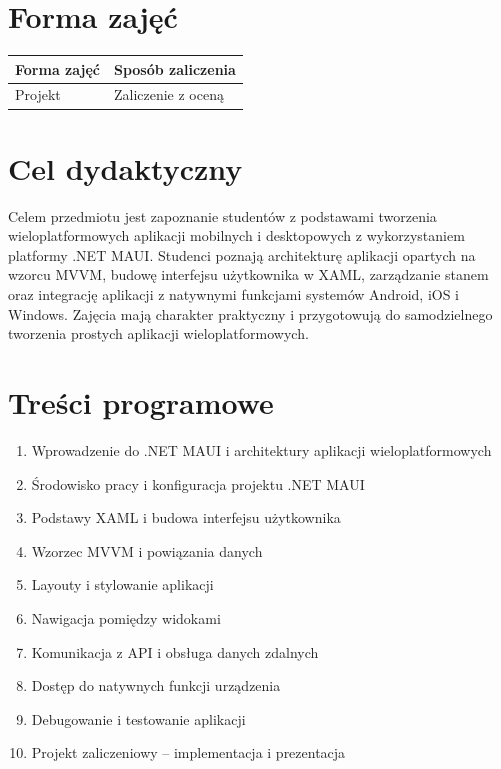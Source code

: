 \documentclass[12pt, a4paper]{article}
\begin{document}
\section{Forma zajęć}

\begin{tabular}{ll}
  \hline
  \textbf{Forma zajęć} & \textbf{Sposób zaliczenia} \\
  \hline
  Projekt & Zaliczenie z oceną \\
  \hline
\end{tabular}

\section{Cel dydaktyczny}

Celem przedmiotu jest zapoznanie studentów z podstawami tworzenia wieloplatformowych aplikacji mobilnych i desktopowych z wykorzystaniem platformy .NET MAUI. Studenci poznają architekturę aplikacji opartych na wzorcu MVVM, budowę interfejsu użytkownika w XAML, zarządzanie stanem oraz integrację aplikacji z natywnymi funkcjami systemów Android, iOS i Windows. Zajęcia mają charakter praktyczny i przygotowują do samodzielnego tworzenia prostych aplikacji wieloplatformowych.

\section{Treści programowe}

\begin{enumerate}
  \item Wprowadzenie do .NET MAUI i architektury aplikacji wieloplatformowych
  \item Środowisko pracy i konfiguracja projektu .NET MAUI
  \item Podstawy XAML i budowa interfejsu użytkownika
  \item Wzorzec MVVM i powiązania danych
  \item Layouty i stylowanie aplikacji
  \item Nawigacja pomiędzy widokami
  \item Komunikacja z API i obsługa danych zdalnych
  \item Dostęp do natywnych funkcji urządzenia
  \item Debugowanie i testowanie aplikacji
  \item Projekt zaliczeniowy – implementacja i prezentacja
\end{enumerate}
\end{document}
